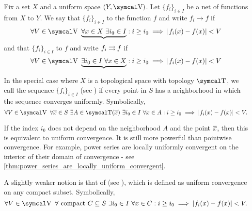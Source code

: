 \begin{definition}\label{def:function_net_convergence}
  Fix a set \( X \) and a uniform space \( (Y, \CV) \). Let \( \{ f_i \}_{i \in I} \) be a net of functions from \( X \) to \( Y \). We say that \( \{ f_i \}_{i \in I} \)  to the function \( f \) and write \( f_i \to f \) if
  \begin{equation}\label{def:function_net_convergence/pointwise}
    \forall V \in \CV \ \underbrace{\forall x \in X \ \exists i_0 \in I} : i \geq i_0 \implies \Abs{f_i(x) - f(x)} < V
  \end{equation}
  and that \( \{ f_i \}_{i \in I} \)  to \( f \) and write \( f_i \rightrightarrows f \) if
  \begin{equation}\label{def:function_net_convergence/uniform}
    \forall V \in \CV \ \underbrace{\exists i_0 \in I \ \forall x \in X} : i \geq i_0 \implies \Abs{f_i(x) - f(x)} < V
  \end{equation}

  In the special case where \( X \) is a topological space with topology \( \CT \), we call the sequence \( \{ f_i \}_{i \in I} \)  (see \cite{ProofWiki:locally_uniform_convergence}) if every point in \( S \) has a neighborhood in which the sequence converges uniformly. Symbolically,
  \begin{equation}\label{def:function_net_convergence/locally_uniform}
    \forall V \in \CV \ \forall \Ol{x} \in S \ \exists A \in \CT(\Ol{x}) \ \exists i_0 \in I \ \forall x \in A : i \geq i_0 \implies \Abs{f_i(x) - f(x)} < V.
  \end{equation}

  If the index \( i_0 \) does not depend on the neighborhood \( A \) and the point \( \overline{x} \), then this is equivalent to uniform convergence. It is still more powerful than pointwise convergence. For example, power series are locally uniformly convergent on the interior of their domain of convergence - see \cref{thm:power_series_are_locally_uniform_convergent}.

  A slightly weaker notion is that of  (see \cite{ProofWiki:compact_convergence}), which is defined as uniform convergence on any compact subset. Symbolically,
  \begin{equation}\label{def:function_net_convergence/compact}
    \forall V \in \CV \ \forall \text{ compact } C \subseteq S \ \exists i_0 \in I \ \forall x \in C : i \geq i_0 \implies \Abs{f_i(x) - f(x)} < V.
  \end{equation}
\end{definition}

